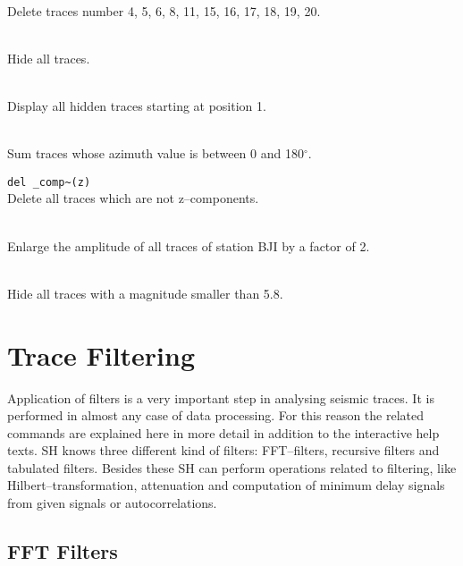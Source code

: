 \noindent
{}\\
Delete traces number 4, 5, 6, 8, 11, 15, 16, 17, 18, 19, 20.
\smallskip

\noindent
{}\\
Hide all traces.
\smallskip

\noindent
{}\\
Display all hidden traces starting at position 1.
\smallskip

\noindent
{}\\
Sum traces whose azimuth value is between 0 and 180$^\circ$.
\smallskip

\noindent
\verb'del _comp~(z)'\\
Delete all traces which are not z--components.
\smallskip

\noindent
{}\\
Enlarge the amplitude of all traces of station BJI by a factor of 2.
\smallskip

\noindent
{}\\
Hide all traces with a magnitude smaller than 5.8.



\section{Trace Filtering}

Application of filters is a very important step in analysing
seismic traces.  It is performed in almost any case of data
processing.  For this reason the related commands are explained
here in more detail in addition to the interactive help texts.
SH knows three different kind of filters:  FFT--filters,
recursive filters and tabulated filters.  Besides these SH
can perform operations related to filtering, like
Hilbert--transformation, attenuation and computation of minimum delay
signals from given signals or autocorrelations.

\subsection{FFT Filters}

